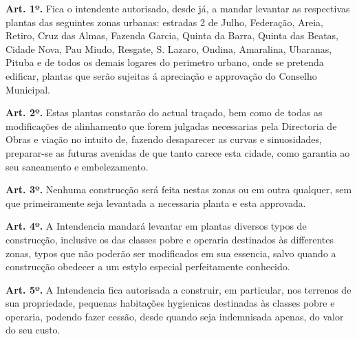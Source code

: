 \begin{citacao}
\textbf{Art. 1º.} Fica o intendente autorisado, desde já, a mandar levantar as respectivas plantas das seguintes zonas urbanas: estradas 2 de Julho, Federação, Areia, Retiro, Cruz das Almas, Fazenda Garcia, Quinta da Barra, Quinta das Beatas, Cidade Nova, Pau Miudo, Resgate, S. Lazaro, Ondina, Amaralina, Ubaranas, Pituba e de todos os demais logares do perimetro urbano, onde se pretenda edificar, plantas que serão sujeitas á apreciação e approvação do Conselho Municipal. 

\textbf{Art. 2º.} Estas plantas constarão do actual traçado, bem como de todas as modificações de alinhamento que forem julgadas necessarias pela Directoria de Obras e viação no intuito de, fazendo desaparecer as curvas e sinuosidades, preparar-se as futuras avenidas de que tanto carece esta cidade, como garantia ao seu saneamento e embelezamento.

\textbf{Art. 3º.} Nenhuma construcção será feita nestas zonas ou em outra qualquer, sem que primeiramente seja levantada a necessaria planta e esta approvada.

\textbf{Art. 4º.} A Intendencia mandará levantar em plantas diversos typos de construcção, inclusive os das classes pobre e operaria destinados às differentes zonas, typos que não poderão ser modificados em sua essencia, salvo quando a construcção obedecer a um estylo especial perfeitamente conhecido.

\textbf{Art. 5º.} A Intendencia fica autorisada a construir, em particular, nos terrenos de sua propriedade, pequenas habitações hygienicas destinadas às classes pobre e operaria, podendo fazer cessão, desde quando seja indemnisada apenas, do valor do seu custo.
\end{citacao}

